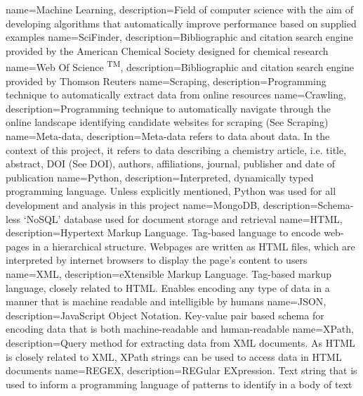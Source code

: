 {
name={Machine Learning},
description={Field of computer science with the aim of developing algorithms that automatically improve performance based on supplied examples \cite{glossarymachinelearning}} 
}
{
name={SciFinder\textsuperscript{\textregistered}},
description={Bibliographic and citation search engine provided by the American Chemical Society designed for chemical research} 
}
{
name={Web Of Science	\textsuperscript{TM}},
description={Bibliographic and citation search engine provided by Thomson Reuters} 
}
{
name={Scraping},
description={Programming technique to automatically extract data from online resources} 
}
{
name={Crawling},
description={Programming technique to automatically navigate through the online landscape identifying candidate websites for scraping (See Scraping)} 
}
{
name={Meta-data},
description={Meta-data refers to data about data. In the context of this project, it refers to data describing a chemistry article, i.e. title, abstract, DOI (See DOI), authors, affiliations, journal, publisher and date of publication}
}
{
name={Python},
description={Interpreted, dynamically typed programming language. Unless explicitly mentioned, Python was used for all development and analysis in this project} 
}
{
name={MongoDB},
description={Schema-less `NoSQL' database used for document storage and retrieval} 
}
{
name={HTML},
description={Hypertext Markup Language. Tag-based language to encode web-pages in a hierarchical structure. Webpages are written as HTML files, which are interpreted by internet browsers to display the page's content to users} 
}
{
name={XML},
description={eXtensible Markup Language. Tag-based markup language, closely related to HTML. Enables encoding any type of data in a manner that is machine readable and intelligible by humans} 
}
{
name={JSON},
description={JavaScript Object Notation. Key-value pair based schema for encoding data that is both machine-readable and human-readable}
}
{
name={XPath},
description={Query method for extracting data from XML documents. As HTML is closely related to XML, XPath strings can be used to access data in HTML documents} 
}
{
name={REGEX},
description={REGular EXpression. Text string that is used to inform a programming language of patterns to identify in a body of text} 
}
